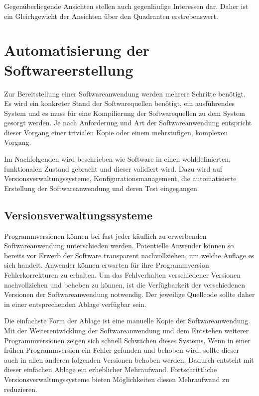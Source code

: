 Gegenüberliegende Ansichten stellen auch gegenläufige Interessen dar. Daher ist ein Gleichgewicht der Ansichten über den Quadranten erstrebenswert.

\section{Automatisierung der Softwareerstellung}
\label{sec:automation-software}

Zur Bereitstellung einer Softwareanwendung werden mehrere Schritte benötigt. Es wird ein konkreter Stand der Softwarequellen benötigt, ein ausführendes System und es muss für eine Kompilierung der Softwarequellen zu dem System gesorgt werden.
Je nach Anforderung und Art der Softwareanwendung entspricht dieser Vorgang einer trivialen Kopie oder einem mehrstufigen, komplexen Vorgang. 

Im Nachfolgenden wird beschrieben wie Software in einen wohldefinierten, funktionalen Zustand gebracht und dieser validiert wird. Dazu wird auf Versionsverwaltungssysteme, Konfigurationsmanagement, die automatisierte Erstellung der Softwareanwendung und deren Test eingegangen.

\subsection{Versionsverwaltungssysteme}
\label{subsec:version-control}
Programmversionen können bei fast jeder käuflich zu erwerbenden Softwareanwendung unterschieden werden. Potentielle 
Anwender können so bereits vor Erwerb der Software transparent nachvollziehen, um welche Auflage es sich handelt. Anwender können erwarten für ihre Programmversion Fehlerkorrekturen zu erhalten. Um das Fehlverhalten verschiedener Versionen nachvollziehen und beheben zu können, ist die Verfügbarkeit der verschiedenen Versionen der Softwareanwendung notwendig. Der jeweilige Quellcode sollte daher in einer entsprechenden Ablage verfügbar sein.

Die einfachste Form der Ablage ist eine manuelle Kopie der Softwareanwendung. Mit der Weiterentwicklung der Softwareanwendung und
dem Entstehen weiterer Programmversionen zeigen sich schnell Schwächen dieses Systems. Wenn in einer frühen 
Programmversion ein Fehler gefunden und behoben wird, sollte dieser auch in allen anderen folgenden Versionen behoben 
werden. Dadurch entsteht mit dieser einfachen Ablage ein erheblicher Mehraufwand. Fortschrittliche 
Versionsverwaltungssysteme bieten Möglichkeiten diesen Mehraufwand zu reduzieren.

